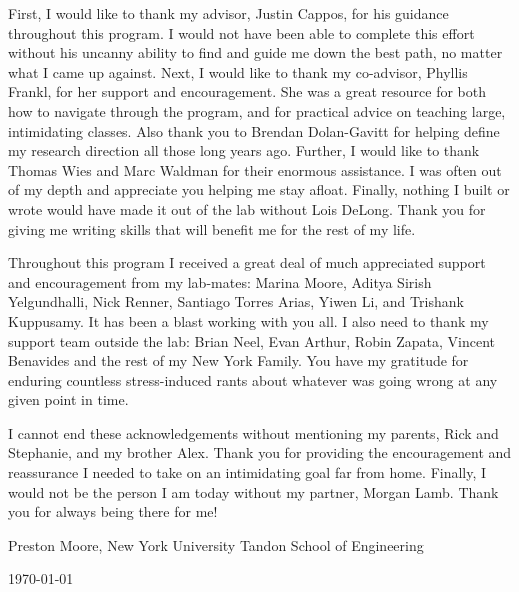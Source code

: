 

First, I would like to thank my advisor, Justin Cappos, for his guidance throughout this program.  I would not have been able to complete this effort without his uncanny ability to find and guide me down the best path, no matter what I came up against.
Next, I would like to thank my co-advisor, Phyllis Frankl, for her support and encouragement. She was a great resource for both how to navigate through the program, and for practical advice on teaching large, intimidating classes.
Also thank you to Brendan Dolan-Gavitt for helping define my research direction all those long years ago.
Further, I would like to thank Thomas Wies and Marc Waldman for their enormous assistance.  I was often out of my depth and appreciate you helping me stay afloat.
Finally, nothing I built or wrote would have made it out of the lab without Lois DeLong.  Thank you for giving me writing skills that will benefit me for the rest of my life.

Throughout this program I received a great deal of much appreciated support and encouragement from my lab-mates: Marina Moore, Aditya Sirish Yelgundhalli, Nick Renner, Santiago Torres Arias, Yiwen Li, and Trishank Kuppusamy. It has been a blast working with you all.
I also need to thank my support team outside the lab: Brian Neel, Evan Arthur, Robin Zapata, Vincent Benavides and the rest of my New York Family. You have my gratitude for enduring countless stress-induced rants about whatever was going wrong at any given point in time.

I cannot end these acknowledgements without mentioning my parents, Rick and Stephanie, and my brother Alex.  Thank you for providing the encouragement and reassurance I needed to take on an intimidating goal far from home.  Finally, I would not be the person I am today without my partner, Morgan Lamb.  Thank you for always being there for me!

\bigskip\medskip

\noindent \hfill Preston Moore, New York University Tandon School of Engineering

\hfill \today

